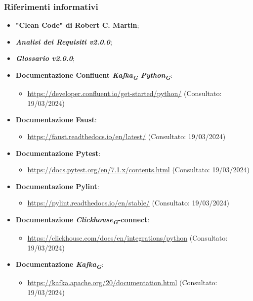\subsubsection{Riferimenti informativi}
\begin{itemize}
    \item \textbf{"Clean Code" di Robert C. Martin};
    \item \textbf{\textit{Analisi dei Requisiti v2.0.0}};
    \item \textbf{\textit{Glossario v2.0.0}};
    \item \textbf{Documentazione Confluent \textit{Kafka}\textsubscript{\textit{G}} \textit{Python}\textsubscript{\textit{G}}}:
    \begin{itemize}
        \item \url{https://developer.confluent.io/get-started/python/} (Consultato: 19/03/2024)
    \end{itemize}
    \item \textbf{Documentazione Faust}: 
    \begin{itemize}
        \item \url{https://faust.readthedocs.io/en/latest/} (Consultato: 19/03/2024)
    \end{itemize}
    \item \textbf{Documentazione Pytest}: 
    \begin{itemize}
        \item \url{https://docs.pytest.org/en/7.1.x/contents.html} (Consultato: 19/03/2024)
    \end{itemize}
    \item \textbf{Documentazione Pylint}: 
    \begin{itemize}
        \item \url{https://pylint.readthedocs.io/en/stable/} (Consultato: 19/03/2024)
    \end{itemize}
    \item \textbf{Documentazione \textit{Clickhouse}\textsubscript{\textit{G}}-connect}: 
    \begin{itemize}
        \item \url{https://clickhouse.com/docs/en/integrations/python} (Consultato: 19/03/2024)
    \end{itemize}
    \item \textbf{Documentazione \textit{Kafka}\textsubscript{\textit{G}}}: 
    \begin{itemize}
        \item \url{https://kafka.apache.org/20/documentation.html} (Consultato: 19/03/2024)

\end{itemize}
\end{itemize}
